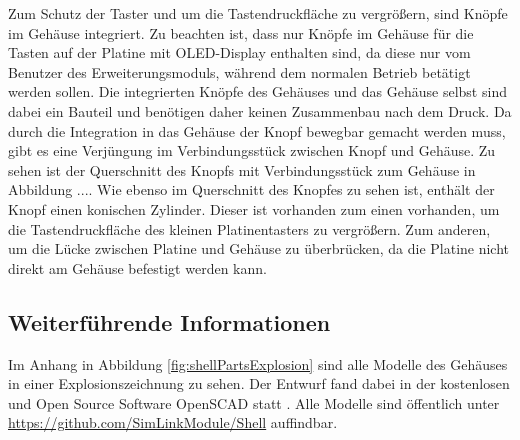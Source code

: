 
Zum Schutz der Taster und um die Tastendruckfläche zu vergrößern, sind Knöpfe im Gehäuse integriert. Zu beachten ist, dass nur Knöpfe im Gehäuse für die Tasten auf der Platine mit \acs{OLED}-Display enthalten sind, da diese nur vom Benutzer des Erweiterungsmoduls, während dem normalen Betrieb betätigt werden sollen. Die integrierten Knöpfe des Gehäuses und das Gehäuse selbst sind dabei ein Bauteil und benötigen daher keinen Zusammenbau nach dem Druck. Da durch die Integration in das Gehäuse der Knopf bewegbar gemacht werden muss, gibt es eine Verjüngung im Verbindungsstück zwischen Knopf und Gehäuse. Zu sehen ist der Querschnitt des Knopfs mit Verbindungsstück zum Gehäuse in Abbildung .... Wie ebenso im Querschnitt des Knopfes zu sehen ist, enthält der Knopf einen konischen Zylinder. Dieser ist vorhanden zum einen vorhanden, um die Tastendruckfläche des kleinen Platinentasters zu vergrößern. Zum anderen, um die Lücke zwischen Platine und Gehäuse zu überbrücken, da die Platine nicht direkt am Gehäuse befestigt werden kann.


\subsection{Weiterführende Informationen}
Im Anhang in Abbildung \ref{fig:shellPartsExplosion} sind alle Modelle des Gehäuses in einer Explosionszeichnung zu sehen. Der Entwurf fand dabei in der kostenlosen und Open Source Software OpenSCAD statt \cite{aboutOpenScad}. Alle Modelle sind öffentlich unter \url{https://github.com/SimLinkModule/Shell} auffindbar.